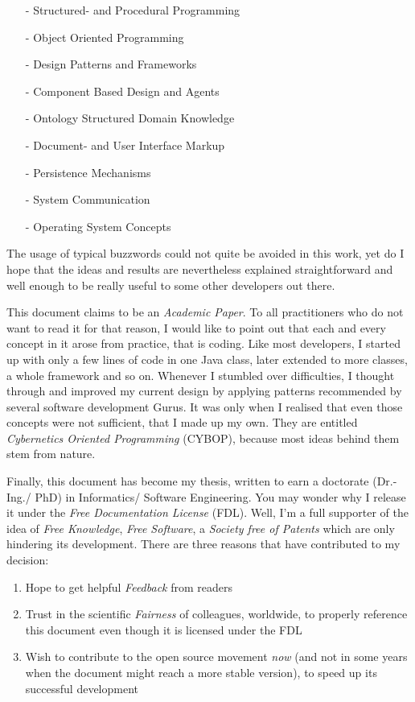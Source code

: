 \begin{itemize}
    \item[-] Structured- and Procedural Programming
    \item[-] Object Oriented Programming
    \item[-] Design Patterns and Frameworks
    \item[-] Component Based Design and Agents
    \item[-] Ontology Structured Domain Knowledge
    \item[-] Document- and User Interface Markup
    \item[-] Persistence Mechanisms
    \item[-] System Communication
    \item[-] Operating System Concepts
\end{itemize}

The usage of typical buzzwords could not quite be avoided in this work, yet do
I hope that the ideas and results are nevertheless explained straightforward and
well enough to be really useful to some other developers out there.

This document claims to be an \emph{Academic Paper}. To all practitioners who do
not want to read it for that reason, I would like to point out that each and
every concept in it arose from practice, that is coding. Like most developers,
I started up with only a few lines of code in one Java class, later extended to
more classes, a whole framework and so on. Whenever I stumbled over difficulties,
I thought through and improved my current design by applying patterns recommended
by several software development Gurus. It was only when I realised that even
those concepts were not sufficient, that I made up my own. They are entitled
\emph{Cybernetics Oriented Programming} (CYBOP), because most ideas behind them
stem from nature.

Finally, this document has become my thesis, written to earn a doctorate
(Dr.-Ing./ PhD) in Informatics/ Software Engineering. You may wonder why I
release it under the \emph{Free Documentation License} (FDL). Well, I'm a full
supporter of the idea of \emph{Free Knowledge}, \emph{Free Software}, a
\emph{Society free of Patents} which are only hindering its development. There
are three reasons that have contributed to my decision:

\begin{enumerate}
    \item Hope to get helpful \emph{Feedback} from readers
    \item Trust in the scientific \emph{Fairness} of colleagues, worldwide, to
        properly reference this document even though it is licensed under the FDL
    \item Wish to contribute to the open source movement \emph{now} (and not in
        some years when the document might reach a more stable version), to
        speed up its successful development
\end{enumerate}

